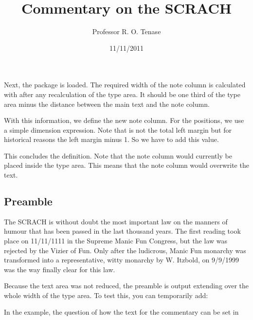 \begin{Example}
  Next, the  package is loaded. The required width of the
  note column is calculated with
   after any
  recalculation%
   of the type area. It should be one third of the type
  area minus the distance between the main text and the note column. %

  With this information, we define the new note column. For the positions, we
  use a simple dimension expression. Note that  is not
  the total left margin but for historical reasons the left margin minus
  1. So we have to add this value.

  This concludes the definition. Note that the note column would currently be
  placed inside the type area. This means that the note column would overwrite
  the text.

\begin{lstcode}
  

  \title{Commentary on the SCRACH}
  \author{Professor R. O. Tenase}
  \date{11/11/2011}
  \maketitle
  \tableofcontents

  \section{Preamble}
  The SCRACH is without doubt the most important law
  on the manners of humour that has been passed in
  the last thousand years. The first reading took
  place on 11/11/1111 in the Supreme Manic Fun
  Congress, but the law was rejected by the Vizier
  of Fun. Only after the ludicrous, Manic Fun
  monarchy was transformed into a representative,
  witty monarchy by W. Itzbold, on 9/9/1999 was
  the way finally clear for this law.
\end{lstcode}
  Because the text area was not reduced, the preamble is
  output extending over the whole width of the type area. To test this, you
  can temporarily add:
\begin{lstcode}
  
\end{lstcode}
\end{Example}
%
In the example, the question of how the text for the commentary can be set in
